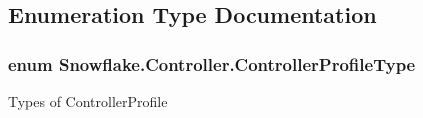 \subsection{Enumeration Type Documentation}
\hypertarget{namespace_snowflake_1_1_controller_af6896d98053b4f8f2d42c32c6fb05c96}{}
\subsubsection[{Controller\+Profile\+Type}]{\setlength{\rightskip}{0pt plus 5cm}enum {\bf Snowflake.\+Controller.\+Controller\+Profile\+Type}}\label{namespace_snowflake_1_1_controller_af6896d98053b4f8f2d42c32c6fb05c96}


Types of Controller\+Profile 

